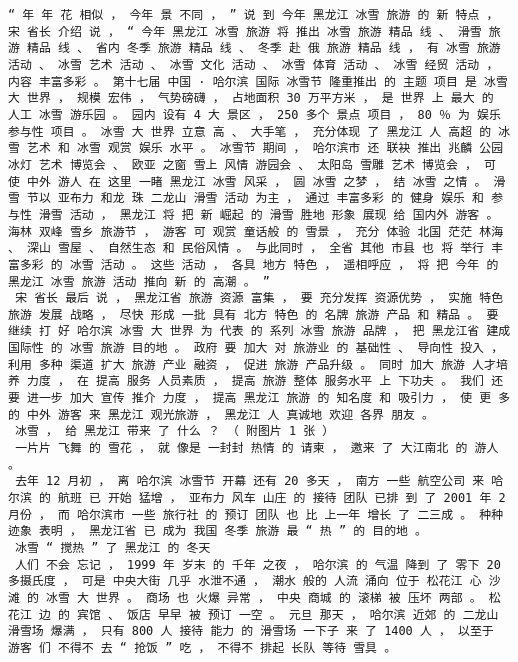 \documentclass{article}
\begin{document}
\begin{Verbatim}[commandchars=\\\{\}]
 “ 年 年 花 相似 ， 今年 景 不同 ， ” 说 到 今年 黑龙江 冰雪 旅游 的 新 特点 ， 宋 省长 介绍 说 ， “ 今年 黑龙江 冰雪 旅游 将 推出 冰雪 旅游 精品 线 、 滑雪 旅游 精品 线 、 省内 冬季 旅游 精品 线 、 冬季 赴 俄 旅游 精品 线 ， 有 冰雪 旅游 活动 、 冰雪 艺术 活动 、 冰雪 文化 活动 、 冰雪 体育 活动 、 冰雪 经贸 活动 ， 内容 丰富多彩 。 第十七届 中国 · 哈尔滨 国际 冰雪节 隆重推出 的 主题 项目 是 冰雪 大 世界 ， 规模 宏伟 ， 气势磅礴 ， 占地面积 30 万平方米 ， 是 世界 上 最大 的 人工 冰雪 游乐园 。 园内 设有 4 大 景区 ， 250 多个 景点 项目 ， 80 ％ 为 娱乐 参与性 项目 。 冰雪 大 世界 立意 高 、 大手笔 ， 充分体现 了 黑龙江 人 高超 的 冰雪 艺术 和 冰雪 观赏 娱乐 水平 。 冰雪节 期间 ， 哈尔滨市 还 联袂 推出 兆麟 公园 冰灯 艺术 博览会 、 欧亚 之窗 雪上 风情 游园会 、 太阳岛 雪雕 艺术 博览会 ， 可 使 中外 游人 在 这里 一睹 黑龙江 冰雪 风采 ， 圆 冰雪 之梦 ， 结 冰雪 之情 。 滑雪 节以 亚布力 和龙 珠 二龙山 滑雪 活动 为主 ， 通过 丰富多彩 的 健身 娱乐 和 参与性 滑雪 活动 ， 黑龙江 将 把 新 崛起 的 滑雪 胜地 形象 展现 给 国内外 游客 。 海林 双峰 雪乡 旅游节 ， 游客 可 观赏 童话般 的 雪景 ， 充分 体验 北国 茫茫 林海 、 深山 雪屋 、 自然生态 和 民俗风情 。 与此同时 ， 全省 其他 市县 也 将 举行 丰富多彩 的 冰雪 活动 。 这些 活动 ， 各具 地方 特色 ， 遥相呼应 ， 将 把 今年 的 黑龙江 冰雪 旅游 活动 推向 新 的 高潮 。 ” 
 宋 省长 最后 说 ， 黑龙江省 旅游 资源 富集 ， 要 充分发挥 资源优势 ， 实施 特色旅游 发展 战略 ， 尽快 形成 一批 具有 北方 特色 的 名牌 旅游 产品 和 精品 。 要 继续 打 好 哈尔滨 冰雪 大 世界 为 代表 的 系列 冰雪 旅游 品牌 ， 把 黑龙江省 建成 国际性 的 冰雪 旅游 目的地 。 政府 要 加大 对 旅游业 的 基础性 、 导向性 投入 ， 利用 多种 渠道 扩大 旅游 产业 融资 ， 促进 旅游 产品升级 。 同时 加大 旅游 人才培养 力度 ， 在 提高 服务 人员素质 ， 提高 旅游 整体 服务水平 上 下功夫 。 我们 还要 进一步 加大 宣传 推介 力度 ， 提高 黑龙江 旅游 的 知名度 和 吸引力 ， 使 更 多 的 中外 游客 来 黑龙江 观光旅游 ， 黑龙江 人 真诚地 欢迎 各界 朋友 。 
 冰雪 ， 给 黑龙江 带来 了 什么 ？ （ 附图片 1 张 ） 
 一片片 飞舞 的 雪花 ， 就 像是 一封封 热情 的 请柬 ， 邀来 了 大江南北 的 游人 。 
 去年 12 月初 ， 离 哈尔滨 冰雪节 开幕 还有 20 多天 ， 南方 一些 航空公司 来 哈尔滨 的 航班 已 开始 猛增 ， 亚布力 风车 山庄 的 接待 团队 已排 到 了 2001 年 2 月份 ， 而 哈尔滨市 一些 旅行社 的 预订 团队 也 比 上一年 增长 了 二三成 。 种种 迹象 表明 ， 黑龙江省 已 成为 我国 冬季 旅游 最 “ 热 ” 的 目的地 。 
 冰雪 “ 搅热 ” 了 黑龙江 的 冬天 
 人们 不会 忘记 ， 1999 年 岁末 的 千年 之夜 ， 哈尔滨 的 气温 降到 了 零下 20 多摄氏度 ， 可是 中央大街 几乎 水泄不通 ， 潮水 般的 人流 涌向 位于 松花江 心 沙滩 的 冰雪 大 世界 。 商场 也 火爆 异常 ， 中央 商城 的 滚梯 被 压坏 两部 。 松花江 边 的 宾馆 、 饭店 早早 被 预订 一空 。 元旦 那天 ， 哈尔滨 近郊 的 二龙山 滑雪场 爆满 ， 只有 800 人 接待 能力 的 滑雪场 一下子 来 了 1400 人 ， 以至于 游客 们 不得不 去 “ 抢饭 ” 吃 ， 不得不 排起 长队 等待 雪具 。 

\end{Verbatim}
\end{document}
